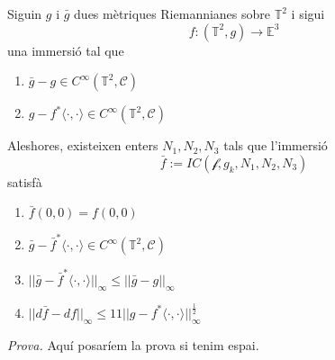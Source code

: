 \begin{teo}\label{teo:Stage}
    Siguin $g$ i $\bar g$ dues mètriques Riemannianes sobre $\mathbb T^2$ i sigui 
    \begin{equation*}
        f:(\mathbb T^2, g)\to\mathbb E^3
    \end{equation*}
    una immersió tal que
    \begin{enumerate}
        \item $\bar g - g\in C^\infty(\mathbb T^2, \mathcal C)$
        \item $g-f^*\langle\cdot, \cdot\rangle\in C^\infty(\mathbb T^2, \mathcal C)$
    \end{enumerate}
    Aleshores, existeixen enters $N_1, N_2, N_3$ tals que l'immersió
    \begin{equation*}
        \bar f:=IC(\mathcal f, g_k, N_1, N_2, N_3)
    \end{equation*}
    satisfà
    \begin{enumerate}
        \item $\bar f(0,0) = f(0,0)$
        \item $\bar g - \bar f^*\langle\cdot, \cdot\rangle\in C^\infty(\mathbb T^2, \mathcal C)$
        \item $||\bar g - \bar f^*\langle\cdot, \cdot\rangle||_\infty\le ||\bar g - g||_\infty$
        \item $||d\bar f - df||_\infty\le11||g-f^*\langle\cdot, \cdot\rangle||_\infty^{\frac{1}{2}}$
    \end{enumerate}
\end{teo}
{\color{green!50!black}
\textit{Prova.} Aquí posaríem la prova si tenim espai.
}
